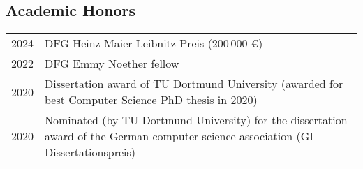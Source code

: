 \documentclass[11pt, a4paper, DIV=14, headings=small]{scrartcl}
\begin{document}
	\subsection*{Academic Honors}
	\begin{longtabu}{p{2.1cm}p{12.0cm}}
		2024 & DFG Heinz Maier-Leibnitz-Preis (200\,000 €)
                                                                                                             \\
		2022 & DFG Emmy Noether fellow                                                                                                             \\
		2020 & Dissertation award of TU Dortmund University (awarded for best Computer Science PhD thesis in 2020)                                 \\
		2020 & Nominated (by TU Dortmund University) for the dissertation award of the German computer science association (GI Dissertationspreis) \\
	\end{longtabu}
	
\end{document}
